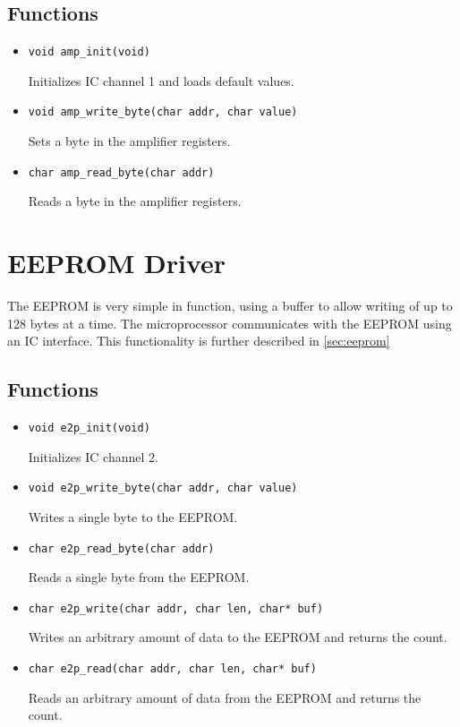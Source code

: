 \subsection*{Functions}
\begin{itemize}
\item \verb|void amp_init(void)|

Initializes IC channel 1 and loads default values.

\item \verb|void amp_write_byte(char addr, char value)|

Sets a byte in the amplifier registers.

\item \verb|char amp_read_byte(char addr)|

Reads a byte in the amplifier registers.
\end{itemize}

\section{EEPROM Driver}
\label{sec:eeprom-driver}
The EEPROM is very simple in function, using a buffer to allow writing of up to 128 bytes at a time. The microprocessor communicates with the EEPROM using an IC interface. This functionality is further described in \autoref{sec:eeprom}

\subsection*{Functions}
\begin{itemize}
\item \verb|void e2p_init(void)|

Initializes IC channel 2.

\item \verb|void e2p_write_byte(char addr, char value)|

Writes a single byte to the EEPROM.

\item \verb|char e2p_read_byte(char addr)|

Reads a single byte from the EEPROM.

\item \verb|char e2p_write(char addr, char len, char* buf)|

Writes an arbitrary amount of data to the EEPROM and returns the count.

\item \verb|char e2p_read(char addr, char len, char* buf)|

Reads an arbitrary amount of data from the EEPROM and returns the count.
\end{itemize}

